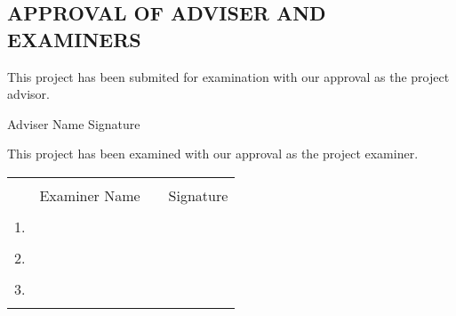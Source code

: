 
\begin{center}
\section*{APPROVAL OF ADVISER AND EXAMINERS}
\end{center}

This project has been submited for examination with our approval as the project advisor.

\vspace{\baselineskip}
Adviser Name \hspace{.1cm}  \makebox[1.6in]{\hrulefill} \hspace{.7cm} Signature \hspace{.1cm}  \makebox[2in]{\hrulefill} 

\vspace{30pt}


This project has been examined with our approval as the project examiner. 

\begin{tabular}{p{1in}p{1.8in}p{.7in}p{1.5in} }
\\
\\
 & Examiner Name &  & Signature \\
 \\
 1. & \hrulefill &  & \hrulefill \\
 \\
 2. & \hrulefill &  & \hrulefill \\
 \\
 3. & \hrulefill &  & \hrulefill \\
 \\
 
\end{tabular}